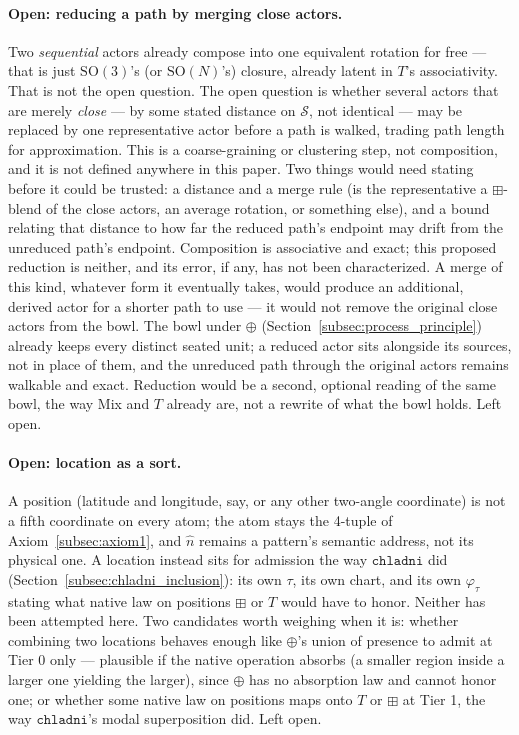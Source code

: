 \documentclass[12pt, a4paper]{article}
\begin{document}
\paragraph{Open: reducing a path by merging close actors.} Two
\emph{sequential} actors already compose into one equivalent rotation
for free --- that is just $\mathrm{SO}(3)$'s (or $\mathrm{SO}(N)$'s)
closure, already latent in $T$'s associativity. That is not the open
question. The open question is whether several actors that are
merely \emph{close} --- by some stated distance on $\mathcal{S}$, not
identical --- may be replaced by one representative actor before a
path is walked, trading path length for approximation. This is a
coarse-graining or clustering step, not composition, and it is not
defined anywhere in this paper. Two things would need stating before
it could be trusted: a distance and a merge rule (is the
representative a $\boxplus$-blend of the close actors, an average
rotation, or something else), and a bound relating that distance to
how far the reduced path's endpoint may drift from the unreduced
path's endpoint. Composition is associative and exact;
this proposed reduction is neither, and its error, if any, has not
been characterized.
A merge of this kind, whatever form it eventually takes, would
produce an additional, derived actor for a shorter path to use --- it
would not remove the original close actors from the bowl. The bowl
under $\oplus$ (Section~\ref{subsec:process_principle}) already keeps
every distinct seated unit; a reduced actor sits alongside its
sources, not in place of them, and the unreduced path through the
original actors remains walkable and exact. Reduction would be a
second, optional reading of the same bowl, the way Mix and $T$
already are, not a rewrite of what the bowl holds. Left open.

\paragraph{Open: location as a sort.} A position (latitude and
longitude, say, or any other two-angle coordinate) is not a fifth
coordinate on every atom; the atom stays the 4-tuple of
Axiom~\ref{subsec:axiom1}, and $\hat n$ remains a pattern's semantic
address, not its physical one. A location instead sits for admission
the way $\mathtt{chladni}$ did
(Section~\ref{subsec:chladni_inclusion}): its own $\tau$, its own
chart, and its own $\varphi_\tau$ stating what native law on positions
$\boxplus$ or $T$ would have to honor. Neither has been attempted
here. Two candidates worth weighing when it is: whether combining two
locations behaves enough like $\oplus$'s union of presence to admit at
Tier 0 only --- plausible if the native operation absorbs (a smaller
region inside a larger one yielding the larger), since $\oplus$ has no
absorption law and cannot honor one; or whether some native law on
positions maps onto $T$ or $\boxplus$ at Tier 1, the way
$\mathtt{chladni}$'s modal superposition did. Left open.
\end{document}
